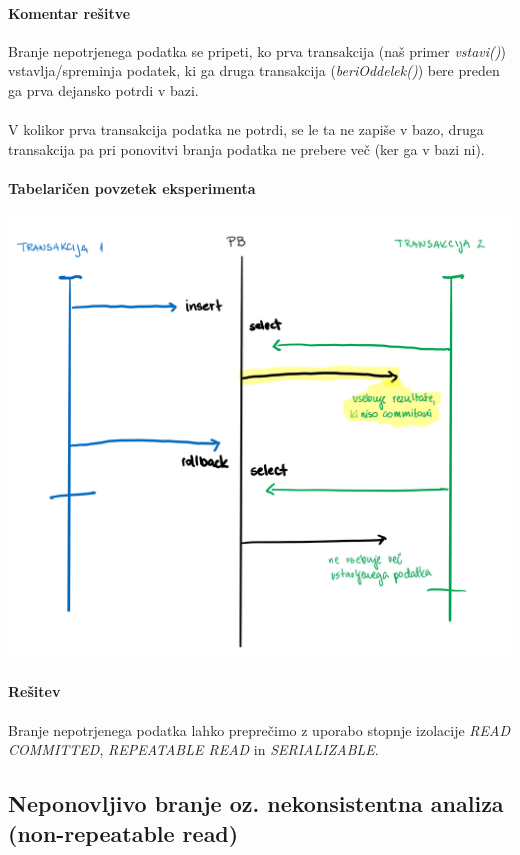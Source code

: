 \documentclass[a4paper,11pt]{report}
\begin{document}
\paragraph{Komentar rešitve}
Branje nepotrjenega podatka se pripeti, ko prva transakcija (naš primer \textit{vstavi()}) vstavlja/spreminja
podatek, ki ga druga transakcija (\textit{beriOddelek()}) bere preden ga prva dejansko potrdi v bazi.\\\\
V kolikor prva transakcija podatka ne potrdi, se le ta ne zapiše v bazo, druga transakcija pa pri ponovitvi branja podatka ne prebere več (ker ga v bazi ni).

\paragraph{Tabelaričen povzetek eksperimenta}\mbox{}

\noindent\includegraphics[width=\linewidth]{./pics/dirty-read.png}

\paragraph{Rešitev}
Branje nepotrjenega podatka lahko preprečimo z uporabo stopnje izolacije \textit{READ COMMITTED}, \textit{REPEATABLE READ} in \textit{SERIALIZABLE}.

\pagebreak
\subsection*{Neponovljivo branje oz. nekonsistentna analiza (non-repeatable read)}
\end{document}
